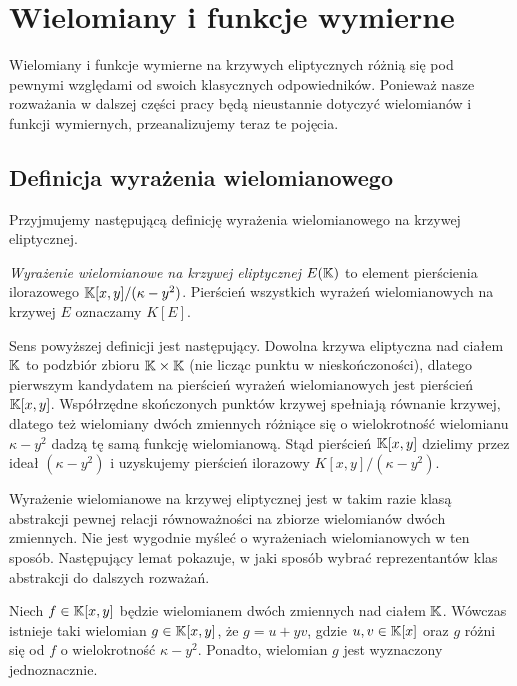 \section{Wielomiany i funkcje wymierne}

Wielomiany i funkcje wymierne na krzywych eliptycznych
różnią się pod pewnymi względami od swoich klasycznych odpowiedników.
Ponieważ nasze rozważania w dalszej części pracy
będą nieustannie dotyczyć wielomianów i funkcji wymiernych,
przeanalizujemy teraz te pojęcia.

\subsection*{Definicja wyrażenia wielomianowego}

Przyjmujemy następującą definicję
wyrażenia wielomianowego na krzywej eliptycznej.

\begin{definition}
\emph{Wyrażenie wielomianowe na krzywej eliptycznej $E(\mathbb{K})$}
to element pierścienia ilorazowego
$\mathbb{K}[x,y]/(\kappa - y^2)$.
Pierścień wszystkich wyrażeń wielomianowych na krzywej $E$
oznaczamy $K[E]$.
\end{definition}

Sens powyższej definicji jest następujący.
Dowolna krzywa eliptyczna nad ciałem $\mathbb{K}$ to podzbiór zbioru $\mathbb{K} \times \mathbb{K}$
(nie licząc punktu w nieskończoności),
dlatego pierwszym kandydatem na pierścień wyrażeń wielomianowych
jest pierścień $\mathbb{K}[x,y]$.
Współrzędne skończonych punktów krzywej spełniają równanie krzywej,
dlatego też wielomiany dwóch zmiennych różniące się
o wielokrotność wielomianu $\kappa- y^2$
dadzą tę samą funkcję wielomianową.
Stąd pierścień $\mathbb{K}[x,y]$ dzielimy przez ideał $(\kappa- y^2)$
i uzyskujemy pierścień ilorazowy $K[x,y]/(\kappa - y^2)$.

Wyrażenie wielomianowe na krzywej eliptycznej
jest w takim razie klasą abstrakcji
pewnej relacji równoważności na zbiorze wielomianów dwóch zmiennych.
Nie jest wygodnie myśleć o wyrażeniach wielomianowych w ten sposób.
Następujący lemat pokazuje,
w jaki sposób wybrać reprezentantów klas abstrakcji
do dalszych rozważań.

\begin{theorem}
Niech $f \in \mathbb{K}[x,y]$
będzie wielomianem dwóch zmiennych nad ciałem $\mathbb{K}$.
Wówczas istnieje taki wielomian $g \in \mathbb{K}[x,y]$,
że $g = u + yv$, gdzie $u, v \in \mathbb{K}[x]$
oraz $g$ różni się od $f$ o wielokrotność $\kappa - y^2$.
Ponadto, wielomian $g$ jest wyznaczony jednoznacznie.
\end{theorem}


